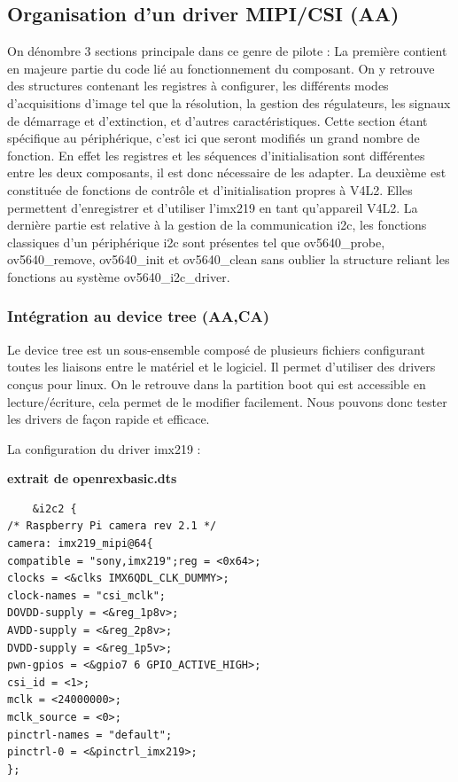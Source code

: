 {\subsection{Organisation d'un driver MIPI/CSI (AA)}

On dénombre 3 sections principale dans ce genre de pilote :
La première contient en majeure partie du code lié au fonctionnement du composant. On y
retrouve des structures contenant les registres à configurer, les différents modes
d’acquisitions d’image tel que la résolution, la gestion des régulateurs, les signaux de
démarrage et d’extinction, et d’autres caractéristiques. Cette section étant spécifique au
périphérique, c’est ici que seront modifiés un grand nombre de fonction. En effet les
registres et les séquences d’initialisation sont différentes entre les deux composants, il est
donc nécessaire de les adapter.
La deuxième est constituée de fonctions de contrôle et d’initialisation propres à V4L2.
Elles permettent d’enregistrer et d’utiliser l’imx219 en tant qu’appareil V4L2.
La dernière partie est relative à la gestion de la communication i2c, les fonctions
classiques d’un périphérique i2c sont présentes tel que ov5640\_probe, ov5640\_remove,
ov5640\_init et ov5640\_clean sans oublier la structure reliant les fonctions au système
ov5640\_i2c\_driver.

\subsubsection{Intégration au device tree (AA,CA)}

Le device tree est un sous-ensemble composé de plusieurs fichiers configurant toutes les
liaisons entre le matériel et le logiciel. Il permet d’utiliser des drivers conçus pour linux. On
le retrouve dans la partition boot qui est accessible en lecture/écriture, cela permet de le
modifier facilement. Nous pouvons donc tester les drivers de façon rapide et efficace.

La configuration du driver imx219 :

\textbf{extrait de openrexbasic.dts}

\begin{lstlisting}
    &i2c2 {
/* Raspberry Pi camera rev 2.1 */
camera: imx219_mipi@64{
compatible = "sony,imx219";reg = <0x64>;
clocks = <&clks IMX6QDL_CLK_DUMMY>;
clock-names = "csi_mclk";
DOVDD-supply = <&reg_1p8v>;
AVDD-supply = <&reg_2p8v>;
DVDD-supply = <&reg_1p5v>;
pwn-gpios = <&gpio7 6 GPIO_ACTIVE_HIGH>;
csi_id = <1>;
mclk = <24000000>;
mclk_source = <0>;
pinctrl-names = "default";
pinctrl-0 = <&pinctrl_imx219>;
};
\end{lstlisting}

}
